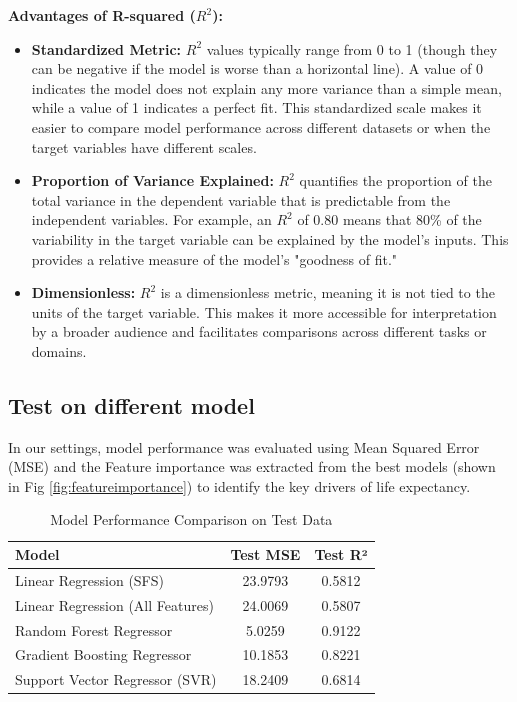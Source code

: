 \documentclass{article}
\begin{document}
\textbf{Advantages of R-squared ($R^2$):}
\begin{itemize}
    \item \textbf{Standardized Metric:} $R^2$ values typically range from 0 to 1 (though they can be negative if the model is worse than a horizontal line). A value of 0 indicates the model does not explain any more variance than a simple mean, while a value of 1 indicates a perfect fit. This standardized scale makes it easier to compare model performance across different datasets or when the target variables have different scales.
    \item \textbf{Proportion of Variance Explained:} $R^2$ quantifies the proportion of the total variance in the dependent variable that is predictable from the independent variables. For example, an $R^2$ of 0.80 means that 80\% of the variability in the target variable can be explained by the model's inputs. This provides a relative measure of the model's "goodness of fit."
    \item \textbf{Dimensionless:} $R^2$ is a dimensionless metric, meaning it is not tied to the units of the target variable. This makes it more accessible for interpretation by a broader audience and facilitates comparisons across different tasks or domains.
\end{itemize}


\subsection{Test on different model}
In our settings, model performance was evaluated using Mean Squared Error (MSE) and the Feature importance was
 extracted from the best models (shown in Fig \ref{fig:featureimportance}) to identify the key drivers of life expectancy.

\begin{table}[h]
    \centering
    \caption{Model Performance Comparison on Test Data}
    \label{tab:model_performance}
    \begin{tabular}{|l|c|c|}
        \hline
        \textbf{Model} & \textbf{Test MSE} & \textbf{Test R²} \\
        \hline
        Linear Regression (SFS) & 23.9793 & 0.5812 \\
        Linear Regression (All Features) & 24.0069 & 0.5807 \\
        Random Forest Regressor & 5.0259 & 0.9122 \\
        Gradient Boosting Regressor & 10.1853 & 0.8221 \\
        Support Vector Regressor (SVR) & 18.2409 & 0.6814 \\
        \hline
    \end{tabular}
\end{table}
\end{document}
